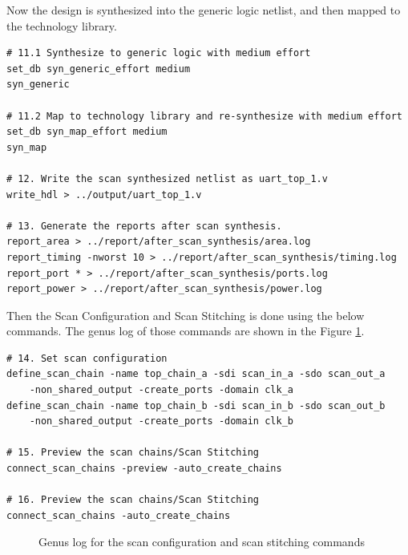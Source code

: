 \documentclass[a4paper,11pt]{article}%
\begin{document}
Now the design is synthesized into the generic logic netlist, and then mapped to the technology library.

\begin{Verbatim}[frame=single]
# 11.1 Synthesize to generic logic with medium effort
set_db syn_generic_effort medium
syn_generic

# 11.2 Map to technology library and re-synthesize with medium effort
set_db syn_map_effort medium
syn_map

# 12. Write the scan synthesized netlist as uart_top_1.v
write_hdl > ../output/uart_top_1.v

# 13. Generate the reports after scan synthesis.
report_area > ../report/after_scan_synthesis/area.log
report_timing -nworst 10 > ../report/after_scan_synthesis/timing.log
report_port * > ../report/after_scan_synthesis/ports.log
report_power > ../report/after_scan_synthesis/power.log
\end{Verbatim}
\pagebreak
Then the Scan Configuration and Scan Stitching is done using the below commands. The genus log of those commands are shown in the Figure \ref{fig:scan_setup_config}.

\begin{Verbatim}[frame=single]
# 14. Set scan configuration 
define_scan_chain -name top_chain_a -sdi scan_in_a -sdo scan_out_a
    -non_shared_output -create_ports -domain clk_a
define_scan_chain -name top_chain_b -sdi scan_in_b -sdo scan_out_b
    -non_shared_output -create_ports -domain clk_b
    
# 15. Preview the scan chains/Scan Stitching
connect_scan_chains -preview -auto_create_chains

# 16. Preview the scan chains/Scan Stitching
connect_scan_chains -auto_create_chains
\end{Verbatim}

\begin{figure}[H]
	\centering
	\caption{Genus log for the scan configuration and scan stitching  commands}
	\label{fig:scan_setup_config}
\end{figure}
\end{document}
